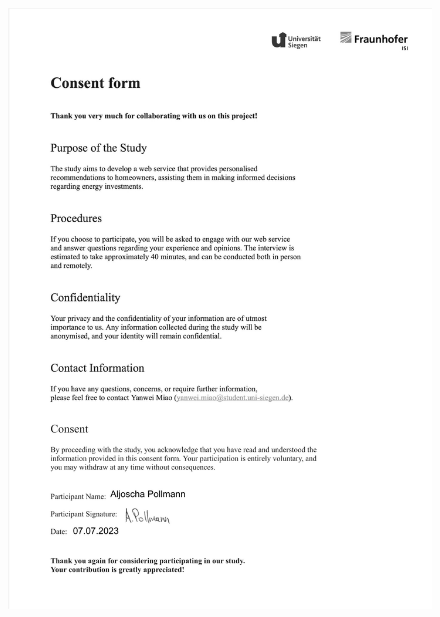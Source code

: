 \begin{figure}[h]
    \centering
    \includegraphics[width=\textwidth]{Images/consent_b.jpg}
\end{figure}

